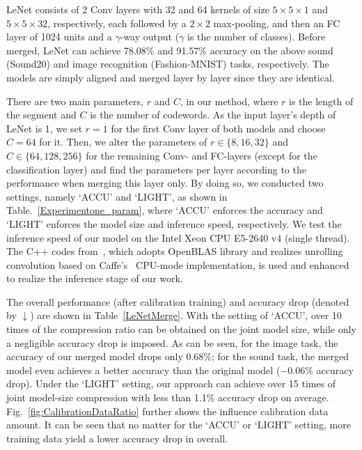 \documentclass{article}
\begin{document}
	LeNet consists of 2 Conv layers with 32 and 64 kernels of size $5 \times 5 \times 1$ and $5 \times 5 \times 32$, respectively, each followed by a $2\times 2$ max-pooling, and then an FC layer of 1024 units and a $\gamma$-way output ($\gamma$ is the number of classes).
	Before merged, LeNet can achieve 78.08\% and 91.57\% accuracy on the above sound (Sound20) and image recognition (Fashion-MNIST) tasks, respectively.
	The models are simply aligned and merged layer by layer since they are identical.
	
	There are two main parameters, $r$ and $C$, in our method, where $r$ is the length of the segment and $C$ is the number of codewords.
	As the input layer's depth of LeNet is 1, we set $r=1$ for the first Conv layer of both models and choose $C=64$ for it.
	Then, we alter the parameters of $r \in \{8, 16, 32\}$ and $C \in \{64, 128, 256\}$ for the remaining Conv- and FC-layers (except for the classification layer) and find the parameters per layer according to the performance when merging this layer only.
	By doing so, we conducted two settings, namely `ACCU' and `LIGHT', as shown in Table.~\ref{Experimentone_param}, where `ACCU' enforces the accuracy and `LIGHT' enforces the model size and inference speed, respectively.
	We test the inference speed of our model on %
	the Intel Xeon CPU E5-2640 v4 (single thread). %
	The C++ codes from~\cite{Wu16}, which adopts OpenBLAS library and realizes unrolling convolution based on Caffe's~\cite{jia2014caffe} CPU-mode implementation, is used and enhanced to realize the inference stage of our work.
	
	The overall performance (after calibration training) and accuracy drop (denoted by $\downarrow$) are shown in Table~\ref{LeNetMerge}.
	With the setting of `ACCU', over 10 times of the compression ratio can be obtained on the joint model size, while only a negligible accuracy drop is imposed.
	As can be seen, for the image task, the accuracy of our merged model drops only $0.68\%$; for the sound task, the merged model even achieves a better accuracy than the original model ($-0.06\%$ accuracy drop).
	Under the `LIGHT' setting, our approach can achieve over 15 times of joint model-size compression
	with less than 1.1\% accuracy drop on average.
	Fig.~\ref{fig:CalibrationDataRatio} further shows the influence calibration data amount.
	It can be seen that no matter for the `ACCU' or `LIGHT' setting, more training data yield a lower accuracy drop in overall.
	
\end{document}
